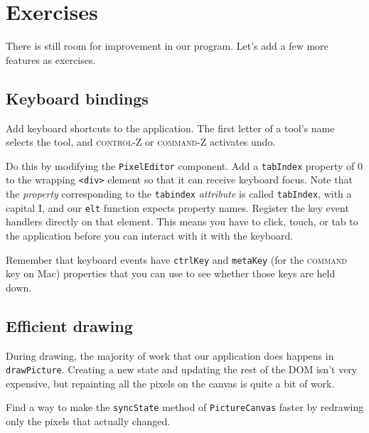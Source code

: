 \section{Exercises}

There is still room for improvement in our program. Let's add a few more features as exercises.

\subsection{Keyboard bindings}

Add keyboard shortcuts to the application. The first letter of a tool's name selects the tool, and \textsc{control}-Z or \textsc{command}-Z activates undo.

Do this by modifying the \lstinline`PixelEditor` component. Add a \lstinline`tabIndex` property of 0 to the wrapping \lstinline`<div>` element so that it can receive keyboard focus. Note that the \emph{property} corresponding to the \lstinline`tabindex` \emph{attribute} is called \lstinline`tabIndex`, with a capital I, and our \lstinline`elt` function expects property names. Register the key event handlers directly on that element. This means you have to click, touch, or tab to the application before you can interact with it with the keyboard.

Remember that keyboard events have \lstinline`ctrlKey` and \lstinline`metaKey` (for the \textsc{command} key on Mac) properties that you can use to see whether those keys are held down.

\subsection{Efficient drawing}

During drawing, the majority of work that our application does happens in \lstinline`drawPicture`. Creating a new state and updating the rest of the DOM isn't very expensive, but repainting all the pixels on the canvas is quite a bit of work.

Find a way to make the \lstinline`syncState` method of \lstinline`PictureCanvas` faster by redrawing only the pixels that actually changed.

